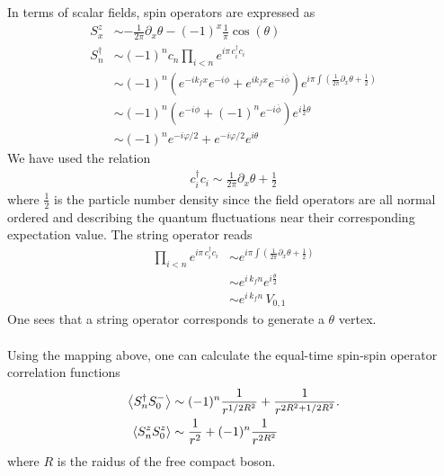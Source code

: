 \documentclass[submission, PhysLectNotes]{SciPost}
\begin{document}
In terms of scalar fields, spin operators are expressed as 
\begin{equation}
	\begin{aligned}
		S_x^z &\sim - \frac{1}{2\pi}\partial_x \theta - \left(-1\right)^x\frac{1}{\pi}\cos (\theta) \\
		S_n^\dagger &\sim \left(-1\right)^n c_n \prod_{i<n}e^{i\pi\,c_i^\dagger c_i} \\
		& \sim (-1)^n \left( e^{-ik_f x} e^{-i\phi} + e^{ik_f x}e^{-i\overline{\phi}}\right) e^{i\pi \int \left(\frac{1}{2\pi}\partial_x \theta + \frac{1}{2}\right)}\\
		&\sim (-1)^n \left( e^{-i\phi} + \left(-1\right)^n e^{-i\overline{\phi}}\right) e^{i\frac{1}{2} \theta}\\
		&\sim (-1)^n e^{-i\varphi/2} + e^{-i\varphi/2} e^{i\theta}
	\end{aligned}
\end{equation}
We have used the relation
\begin{equation}
	\begin{aligned}
		c_i^\dagger c_i \sim \frac{1}{2\pi}\partial_x \theta + \frac{1}{2}
	\end{aligned}
\end{equation}
where $\frac{1}{2}$ is the particle number density since the field operators are all normal ordered and describing the quantum fluctuations near their corresponding expectation value. The string operator reads
\begin{equation}
	\begin{aligned}
		\prod_{i<n}e^{i\pi\,c_i^\dagger c_i} &\sim e^{i\pi \int \left(\frac{1}{2\pi}\partial_x \theta + \frac{1}{2}\right)} \\
		&\sim e^{i\,k_f n} e^{i\frac{\theta}{2}} \\
		&\sim e^{i\,k_f n} \, V_{0,1}
	\end{aligned}
\end{equation}
One sees that a string operator corresponds to generate a $\theta$ vertex. \\


 \\
Using the mapping above, one can calculate the equal-time spin-spin operator correlation functions
\begin{equation}
	\begin{aligned}
		\expval{S^\dagger_n S^-_0} &\sim (-1)^n \frac{1}{r^{1/2R^2}} + \frac{1}{r^{2R^2+1/2R^2}}. \\
		\expval{S_n^z S^z_0} &\sim \frac{1}{r^2} + (-1)^n\frac{1}{r^{2R^2}}
	\end{aligned}
\end{equation}
where $R$ is the raidus of the free compact boson.
\end{document}
